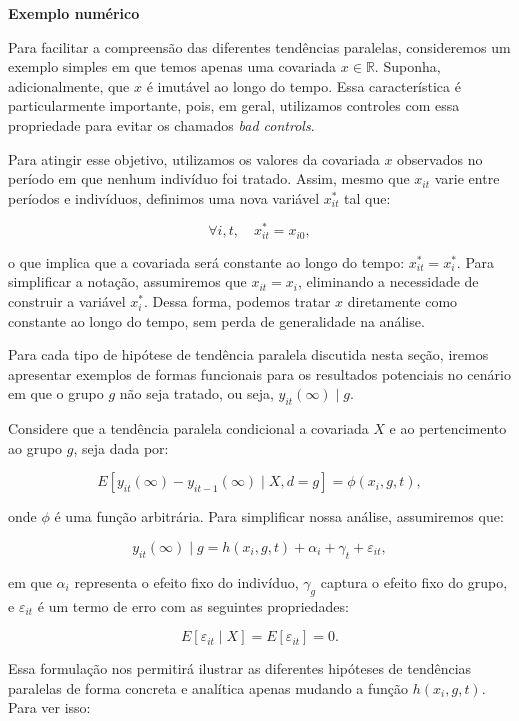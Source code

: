 \documentclass[portugues]{article}
\begin{document}
\begin{box_ex}

\noindent \textbf{Exemplo numérico}

Para facilitar a compreensão das diferentes tendências paralelas, consideremos um exemplo simples em que temos apenas uma covariada $x \in \mathbb{R}$. Suponha, adicionalmente, que $x$ é imutável ao longo do tempo. Essa característica é particularmente importante, pois, em geral, utilizamos controles com essa propriedade para evitar os chamados \textit{bad controls}. 

Para atingir esse objetivo, utilizamos os valores da covariada $x$ observados no período em que nenhum indivíduo foi tratado. Assim, mesmo que $x_{it}$ varie entre períodos e indivíduos, definimos uma nova variável $x^*_{it}$ tal que:

$$\forall i, t, \quad x^*_{it} = x_{i0},$$

\noindent o que implica que a covariada será constante ao longo do tempo: $x^*_{it} = x^{*}_i$. Para simplificar a notação, assumiremos que $x_{it} = x_{i}$, eliminando a necessidade de construir a variável $x_i^*$. Dessa forma, podemos tratar $x$ diretamente como constante ao longo do tempo, sem perda de generalidade na análise.

Para cada tipo de hipótese de tendência paralela discutida nesta seção, iremos apresentar exemplos de formas funcionais para os resultados potenciais no cenário em que o grupo $g$ não seja tratado, ou seja, $y_{it}(\infty) \mid g$. 

Considere que a tendência paralela condicional a covariada $X$ e ao pertencimento ao grupo $g$, seja dada por:

$$ 
E[y_{it}(\infty) - y_{it-1}(\infty) \mid X, d = g] = \phi(x_i, g, t),
$$

\noindent onde $\phi$ é uma função arbitrária. Para simplificar nossa análise, assumiremos que:

$$ 
y_{it}(\infty) \mid g = h(x_i, g, t) + \alpha_i + \gamma_t + \varepsilon_{it}, 
$$

\noindent em que $\alpha_i$ representa o efeito fixo do indivíduo, $\gamma_g$ captura o efeito fixo do grupo, e $\varepsilon_{it}$ é um termo de erro com as seguintes propriedades:

$$ 
E[\varepsilon_{it} \mid X] = E[\varepsilon_{it}] = 0. 
$$

Essa formulação nos permitirá ilustrar as diferentes hipóteses de tendências paralelas de forma concreta e analítica apenas mudando a função $h(x_i, g, t)$. Para ver isso:


\end{box_ex}
\end{document}
